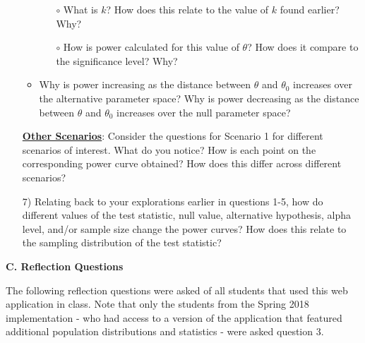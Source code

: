 \documentclass{TISE}
\begin{document}
\begin{enumerate}
\begin{itemize}
\begin{itemize}
			\item[$\circ$] What is $k$? How does this relate to the value of $k$ found earlier? Why? \vspace{.5in}
			\item[$\circ$] How is power calculated for this value of $\theta$? How does it compare to the significance level? Why? \vspace{.5in}
		\end{itemize}
		\item Why is power increasing as the distance between $\theta$ and $\theta_0$ increases over the alternative parameter space? Why is power decreasing as the distance between $\theta$ and $\theta_0$ increases over the null parameter space? \vspace{1in}
	\end{itemize}

	\textbf{\underline{Other Scenarios}}: Consider the questions for Scenario 1 for different scenarios of interest. What do you notice? How is each point on the corresponding power curve obtained? How does this differ across different scenarios?
	
	\vspace{3in}
	
	\item[7)] Relating back to your explorations earlier in questions 1-5, how do different values of the test statistic, null value, alternative hypothesis, alpha level, and/or sample size change the power curves? How does this relate to the sampling distribution of the test statistic? \vspace{2in}
\end{enumerate}

\newpage

\begin{center}
	\textbf{\large C. Reflection Questions}
\end{center}

The following reflection questions were asked of all students that used this web application in class. Note that only the students from the Spring 2018 implementation - who had access to a version of the application that featured additional population distributions and statistics - were asked question 3. 
\end{document}

